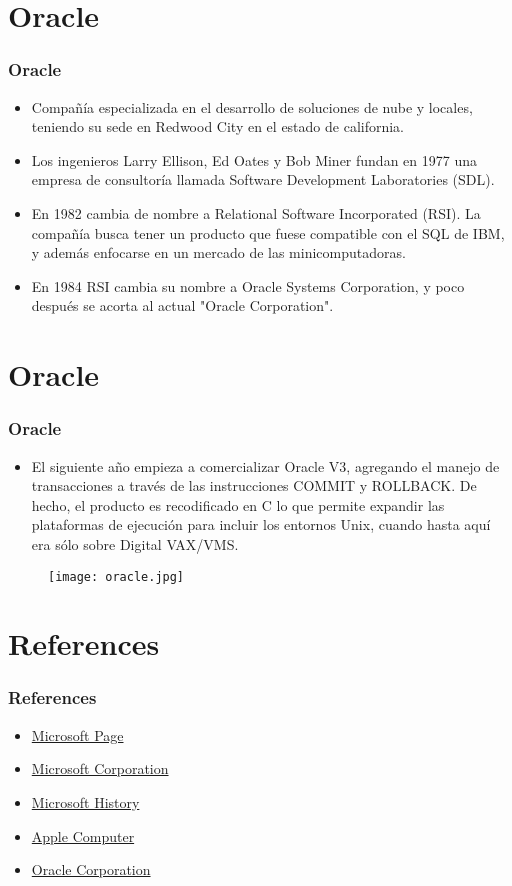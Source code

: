 \documentclass[11pt]{beamer}
\begin{document}
\section{Oracle}
\begin{frame}
\frametitle{Oracle}
\begin{itemize}
    \item Compañía especializada en el desarrollo de soluciones de nube y locales, teniendo su sede en Redwood City en el estado de california.
    \item Los ingenieros Larry Ellison, Ed Oates y Bob Miner fundan en 1977 una empresa de consultoría llamada Software Development Laboratories (SDL).
    \item En 1982  cambia de nombre a Relational Software Incorporated (RSI). La compañía busca tener un producto que fuese compatible con el SQL de IBM, y además enfocarse en un mercado de las minicomputadoras.
    \item En 1984 RSI cambia su nombre a Oracle Systems Corporation, y poco después se acorta al actual "Oracle Corporation".
\end{itemize}
\end{frame}

\section{Oracle}
\begin{frame}
\frametitle{Oracle}
\begin{itemize}
    \item El siguiente año empieza a comercializar Oracle V3, agregando el manejo de transacciones a través de las instrucciones COMMIT y ROLLBACK. De hecho, el producto es recodificado en C lo que permite expandir las plataformas de ejecución para incluir los entornos Unix, cuando hasta aquí era sólo sobre Digital VAX/VMS.
\end{itemize}
\begin{figure}
    \centering
    \texttt{[image: oracle.jpg]}
    \label{fig:my_label}
\end{figure}
\end{frame}


\section{References}

\begin{frame}
\frametitle{References}
\begin{itemize}
\item \href{https://www.microsoft.com/}{Microsoft Page}
\item \href{https://es.wikipedia.org/wiki/Microsoft}{Microsoft Corporation}
\item \href{https://es.wikipedia.org/wiki/Historia_de_Microsoft}{Microsoft History}
\item \href{https://es.wikipedia.org/wiki/Apple}{Apple Computer}
\item \href{https://es.wikipedia.org/wiki/Oracle_Corporation#Historia}{Oracle Corporation}
\end{itemize}
\end{frame}
\end{document}
